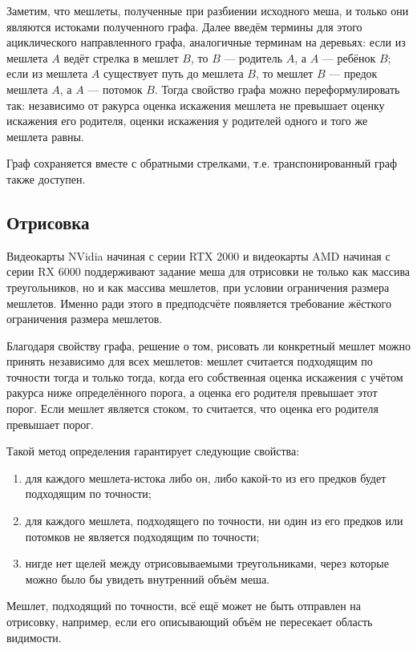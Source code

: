Заметим, что мешлеты, полученные при разбиении исходного меша, и только они являются истоками полученного графа.
Далее введём термины для этого ациклического направленного графа, аналогичные терминам на деревьях: если из мешлета $A$ ведёт стрелка в мешлет $B$, то $B$ --- родитель $A$, а $A$ --- ребёнок $B$; если из мешлета $A$ существует путь до мешлета $B$, то мешлет $B$ --- предок мешлета $A$, а $A$ --- потомок $B$.
Тогда свойство графа можно переформулировать так: независимо от ракурса оценка искажения мешлета не превышает оценку искажения его родителя, оценки искажения у родителей одного и того же мешлета равны.

Граф сохраняется вместе с обратными стрелками, т.е. транспонированный граф также доступен.

\subsection*{Отрисовка}
Видеокарты NVidia начиная с серии RTX 2000 и видеокарты AMD начиная с серии RX 6000 поддерживают задание меша для отрисовки не только как массива треугольников, но и как массива мешлетов, при условии ограничения размера мешлетов.
Именно ради этого в предподсчёте появляется требование жёсткого ограничения размера мешлетов.

Благодаря свойству графа, решение о том, рисовать ли конкретный мешлет можно принять независимо для всех мешлетов: мешлет считается подходящим по точности тогда и только тогда, когда его собственная оценка искажения с учётом ракурса ниже определённого порога, а оценка его родителя превышает этот порог.
Если мешлет является стоком, то считается, что оценка его родителя превышает порог.

Такой метод определения гарантирует следующие свойства:
\begin{enumerate}
    \item для каждого мешлета-истока либо он, либо какой-то из его предков будет подходящим по точности;
    \label{nanite-render-trait-1}
    \item для каждого мешлета, подходящего по точности, ни один из его предков или потомков не является подходящим по точности;
    \label{nanite-render-trait-2}
    \item нигде нет щелей между отрисовываемыми треугольниками, через которые можно было бы увидеть внутренний объём меша.
\end{enumerate}

Мешлет, подходящий по точности, всё ещё может не быть отправлен на отрисовку, например, если его описывающий объём не пересекает область видимости.

